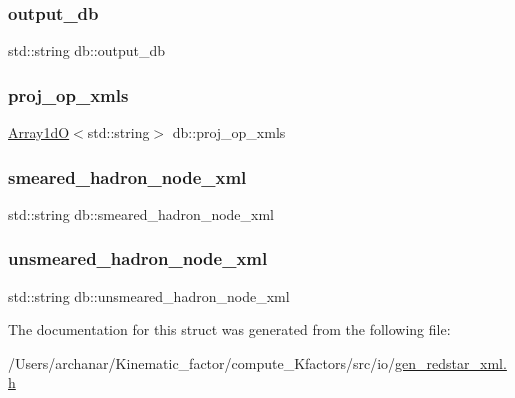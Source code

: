 \subsubsection{\texorpdfstring{output\_db}{output\_db}}
{\footnotesize\ttfamily std\+::string db\+::output\+\_\+db}

\mbox{\label{structdb_a418dc569af05ab376447a80b2e6f4362}} 
\subsubsection{\texorpdfstring{proj\_op\_xmls}{proj\_op\_xmls}}
{\footnotesize\ttfamily \mbox{\hyperlink{classADAT_1_1Array1dO}{Array1dO}}$<$std\+::string$>$ db\+::proj\+\_\+op\+\_\+xmls}

\mbox{\label{structdb_a552ba1dba16b0c5b39f50e8cac0aec08}} 
\subsubsection{\texorpdfstring{smeared\_hadron\_node\_xml}{smeared\_hadron\_node\_xml}}
{\footnotesize\ttfamily std\+::string db\+::smeared\+\_\+hadron\+\_\+node\+\_\+xml}

\mbox{\label{structdb_af07d40bcc407b2e0b9d066ab85e9ab61}} 
\subsubsection{\texorpdfstring{unsmeared\_hadron\_node\_xml}{unsmeared\_hadron\_node\_xml}}
{\footnotesize\ttfamily std\+::string db\+::unsmeared\+\_\+hadron\+\_\+node\+\_\+xml}



The documentation for this struct was generated from the following file\+:\begin{DoxyCompactItemize}
\item 
/\+Users/archanar/\+Kinematic\+\_\+factor/compute\+\_\+\+Kfactors/src/io/\mbox{\hyperlink{gen__redstar__xml_8h}{gen\+\_\+redstar\+\_\+xml.\+h}}\end{DoxyCompactItemize}
